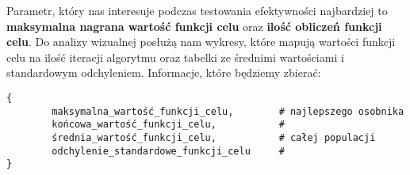 \documentclass[11pt]{article}
\begin{document}
Parametr, który nas interesuje podczas testowania efektywności najbardziej to \textbf{maksymalna nagrana wartość funkcji celu} oraz \textbf{ilość obliczeń funkcji celu}. Do analizy wizualnej posłużą nam wykresy, które mapują wartości funkcji celu na ilość iteracji algorytmu oraz tabelki ze średnimi wartościami i standardowym odchyleniem. Informacje, które będziemy zbierać:
\begin{verbatim}
{
        maksymalna_wartość_funkcji_celu,        # najlepszego osobnika
        końcowa_wartość_funkcji_celu,           #
        średnia_wartość_funkcji_celu,           # całej populacji
        odchylenie_standardowe_funkcji_celu     #
}
\end{verbatim}
\end{document}
